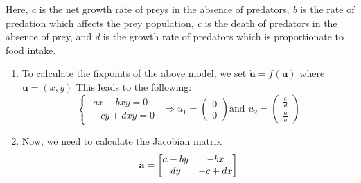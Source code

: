 Here, \textit{a} is the net growth rate of preys in the absence of predators, \textit{b} is the rate of predation which affects the prey population, \textit{c} is the death of predators in the absence of prey, and \textit{d} is the growth rate of predators which is proportionate to food intake.

\begin{enumerate}
\item To calculate the fixpoints of the above model, we set $ \dot{\textbf{u}} = f(\textbf{u}) $ where $ \textbf{u} =(x,y) $ This leads to the following:
	\begin{equation}
		\begin{cases}
			\begin{aligned}
				ax -bxy = 0 \\
				-cy + dxy = 0
			\end{aligned}
		\end{cases}
				\Longrightarrow 
				u_{1} =
				\begin{pmatrix}
				0 \\
				0
				\end{pmatrix}
				\text{and } u_{2} =
				\begin{pmatrix}
				\frac{c}{d} \\
				\frac{a}{b}
				\end{pmatrix}
	\end{equation}

\item Now, we need to calculate the Jacobian matrix
	\begin{equation}
		\normalfont\textbf{a} =
			\begin{bmatrix}
				a - by & -bx \\
				dy & -c+dx
			\end{bmatrix}
	\end{equation}


\end{enumerate}
